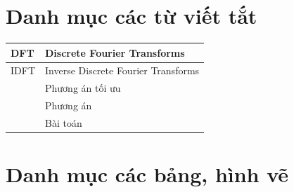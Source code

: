 \documentclass[12pt,a4paper]{report}
\numberwithin{equation}{section}
\theoremstyle{definition} %
\begin{document}
	
	\newpage
	
	\tableofcontents

	\chapter*{Danh mục các từ viết tắt  }
\thispagestyle{fancy}
\vspace{1cm}
\indent

\begin{center}
	\begin{tabular}{ |p{3cm}|p{5cm}|  }
		\hline
		DFT & Discrete Fourier Transforms  \\ \hline
		IDFT & Inverse Discrete Fourier Transforms  \\ \hline
		 & Phương án tối ưu \\ \hline
			 & Phương án\\ \hline
		& Bài toán  \\ \hline
	
		\hline
	\end{tabular}
\end{center}

	\chapter*{Danh mục các bảng, hình vẽ  }
\thispagestyle{fancy}
\vspace{1cm}
\indent
\end{document}
